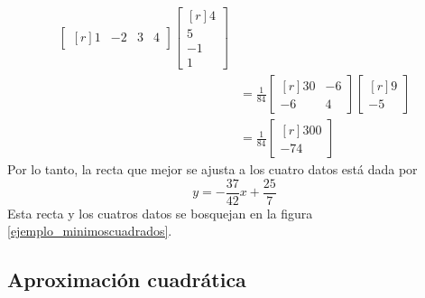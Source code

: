 \begin{example}
\begin{align*}
\begin{bmatrix*}[r]
            1 & -2 & 3 & 4
        \end{bmatrix*} \begin{bmatrix*}[r]
            4 \\
            5 \\
            -1 \\
            1
        \end{bmatrix*} \\
        & = \frac{1}{84} \begin{bmatrix*}[r]
            30 & -6 \\
            -6 & 4
        \end{bmatrix*} \begin{bmatrix*}[r]
            9 \\
            -5
        \end{bmatrix*} \\
        & = \frac{1}{84} \begin{bmatrix*}[r]
            300 \\
            -74
        \end{bmatrix*}
    \end{align*}
    Por lo tanto, la recta que mejor se ajusta a los cuatro datos está dada por
    $$y = - \frac{37}{42} x + \frac{25}{7}$$
    Esta recta y los cuatros datos se bosquejan en la figura \ref{ejemplo_minimoscuadrados}.
\end{example}

\subsection*{Aproximación cuadrática}

